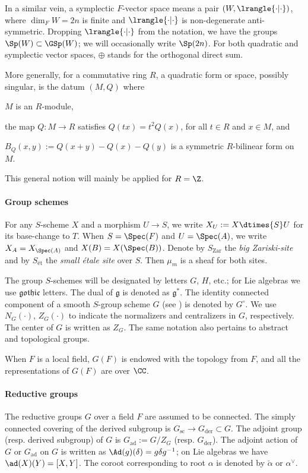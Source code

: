 \documentclass[a4paper,10pt]{article}
\begin{document}
In a similar vein, a symplectic $F$-vector space means a pair $(W, \lrangle{\cdot|\cdot})$, where $\dim_F W = 2n$ is finite and $\lrangle{\cdot|\cdot}$ is non-degenerate anti-symmetric. Dropping $\lrangle{\cdot|\cdot}$ from the notation, we have the groups $\Sp(W) \subset \GSp(W)$; we will occasionally write $\Sp(2n)$. For both quadratic and symplectic vector spaces, $\oplus$ stands for the orthogonal direct sum.

More generally, for a commutative ring $R$, a quadratic form or space, possibly singular, is the datum $(M,Q)$ where
\begin{inparaenum}[(a)]
	\item $M$ is an $R$-module,
	\item the map $Q: M \to R$ satisfies $Q(tx) = t^2 Q(x)$, for all $t \in R$ and $x \in M$, and
	\item $B_Q(x,y) := Q(x+y) - Q(x) - Q(y)$ is a symmetric $R$-bilinear form on $M$.
\end{inparaenum}
This general notion will mainly be applied for $R=\Z$.

\paragraph{Group schemes}
For any $S$-scheme $X$ and a morphism $U \to S$, we write $X_U := X \dtimes{S} U$ for its base-change to $T$. When $S = \Spec(F)$ and $U = \Spec(A)$, we write $X_A = X_{\Spec(A)}$ and $X(B) = X(\Spec(B))$. Denote by $S_\text{Zar}$ the \emph{big Zariski-site} and by $S_\text{ét}$ the \emph{small étale site} over $S$. Then $\mu_m$ is a sheaf for both sites.

The group $S$-schemes will be designated by letters $G$, $H$, etc.; for Lie algebras we use $\mathfrak{gothic}$ letters. The dual of $\mathfrak{g}$ is denoted as $\mathfrak{g}^*$. The identity connected component of a smooth $S$-group scheme $G$ (see \cite[Exposé $\mathrm{VI}_{\mathrm{B}}$ Théorème 3.10]{SGA3-1}) is denoted by $G^\circ$. We use $N_G(\cdot)$, $Z_G(\cdot)$ to indicate the normalizers and centralizers in $G$, respectively. The center of $G$ is written as $Z_G$. The same notation also pertains to abstract and topological groups.

When $F$ is a local field, $G(F)$ is endowed with the topology from $F$, and all the representations of $G(F)$ are over $\CC$.

\paragraph{Reductive groups}
The reductive groups $G$ over a field $F$ are assumed to be connected. The simply connected covering of the derived subgroup is $G_\text{sc} \to G_\text{der} \subset G$. The adjoint group (resp. derived subgroup) of $G$ is $G_\text{ad} := G/Z_G$ (resp. $G_\text{der}$). The adjoint action of $G$ or $G_\text{ad}$ on $G$ is written as $\Ad(g)(\delta) = g\delta g^{-1}$; on Lie algebras we have $\ad(X)(Y) = [X,Y]$. The coroot corresponding to root $\alpha$ is denoted by $\check{\alpha}$ or $\alpha^\vee$.
\end{document}

